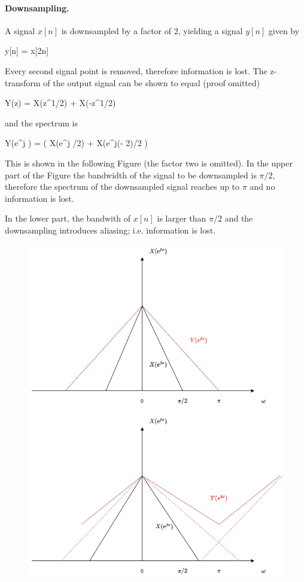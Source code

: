 \paragraph{Downsampling.} A signal $x[n]$ is downsampled by a factor of $2$, yielding a signal $y[n]$ given by

\bee
y[n] = x[2n]
\eee

Every second signal point is removed, therefore information is lost. The z-transform of the output signal can be shown to equal (proof omitted)

\bee
Y(z) =  X(z^{1/2}) +  X(-z^{1/2})
\eee

and the spectrum is

\bee
Y(e^{j \omega}) =  \left( X(e^{j \omega/2}) + X(e^{j(\omega - 2\pi)/2} \right)
\eee

This is shown in the following Figure (the factor two is omitted). In the upper part of the Figure the bandwidth of the signal to be downsampled is $\pi/2$, therefore the spectrum of the downsampled signal reaches up to $\pi$ and no information is lost.

In the lower part, the bandwith of $x[n]$ is larger than $\pi/2$ and the downsampling introduces aliasing; i.e. information is lost.

\begin{figure}[H]
    \centering
    \includegraphics[scale=0.5]{images/2021-11-09-subband_06.png}
\end{figure}


